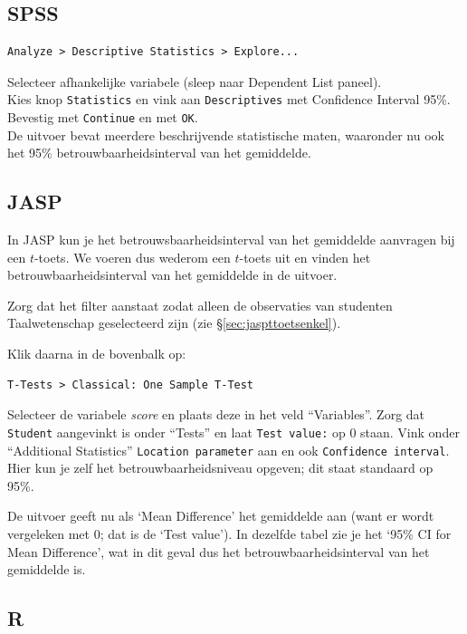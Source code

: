 \documentclass[
]{book}
\begin{document}
\subsection{SPSS}\label{spss-11}

\begin{verbatim}
Analyze > Descriptive Statistics > Explore...
\end{verbatim}

Selecteer afhankelijke variabele (sleep naar Dependent List paneel).\\
Kies knop \texttt{Statistics} en vink aan \texttt{Descriptives} met Confidence
Interval 95\%.\\
Bevestig met \texttt{Continue} en met \texttt{OK}.\\
De uitvoer bevat meerdere beschrijvende statistische maten, waaronder nu
ook het 95\% betrouwbaarheidsinterval van het gemiddelde.

\subsection{JASP}\label{jasp-12}

In JASP kun je het betrouwsbaarheidsinterval van het gemiddelde
aanvragen bij een \(t\)-toets. We voeren dus wederom een \(t\)-toets uit en
vinden het betrouwbaarheidsinterval van het gemiddelde in de uitvoer.

Zorg dat het filter aanstaat zodat alleen de observaties van studenten
Taalwetenschap geselecteerd zijn (zie §\ref{sec:jaspttoetsenkel}).

Klik daarna in de bovenbalk op:

\begin{verbatim}
T-Tests > Classical: One Sample T-Test
\end{verbatim}

Selecteer de variabele \emph{score} en plaats deze in het veld ``Variables''.
Zorg dat \texttt{Student} aangevinkt is onder ``Tests'' en laat \texttt{Test\ value:} op
0 staan. Vink onder ``Additional Statistics'' \texttt{Location\ parameter} aan en
ook \texttt{Confidence\ interval}. Hier kun je zelf het betrouwbaarheidsniveau
opgeven; dit staat standaard op 95\%.

De uitvoer geeft nu als `Mean Difference' het gemiddelde aan (want er
wordt vergeleken met 0; dat is de `Test value'). In dezelfde tabel zie
je het `95\% CI for Mean Difference', wat in dit geval dus het
betrouwbaarheidsinterval van het gemiddelde is.

\subsection{R}\label{r-13}
\end{document}

